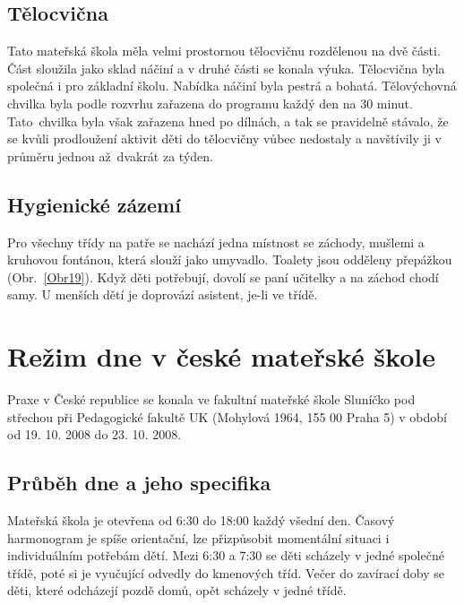 		\subsection{Tělocvična}
			Tato mateřská škola měla velmi prostornou tělocvičnu rozdělenou na dvě části. Část sloužila jako sklad náčiní a v druhé části se konala výuka. Tělocvična byla společná i pro základní školu. Nabídka náčiní byla pestrá a bohatá. Tělovýchovná chvilka byla podle rozvrhu zařazena do programu každý den na 30 minut. Tato chvilka byla však zařazena hned po dílnách, a tak se pravidelně stávalo, že se kvůli prodloužení aktivit děti do tělocvičny vůbec nedostaly a navštívily ji v průměru jednou až dvakrát za týden. 

		\subsection{Hygienické zázemí}
		\label{zachody}
			Pro všechny třídy na patře se nachází jedna místnost se záchody, mušlemi a kruhovou fontánou, která slouží jako umyvadlo. Toalety jsou odděleny přepážkou (Obr.~\ref{Obr19}). Když děti potřebují, dovolí se paní učitelky a na záchod chodí samy. U menších dětí je doprovází asistent, je-li ve třídě. 
	



\section{Režim dne v české mateřské škole}

		Praxe v České republice se konala ve fakultní mateřské škole Sluníčko pod střechou při Pedagogické fakultě UK (Mohylová 1964, 155 00 Praha 5) v období od 19. 10. 2008 do 23. 10. 2008. 

	\subsection{Průběh dne a jeho specifika}

			Mateřská škola je otevřena od 6:30 do 18:00 každý všední den. Časový harmonogram je spíše orientační, lze přizpůsobit momentální situaci i individuálním potřebám dětí. Mezi 6:30 a 7:30 se děti scházely v jedné společné třídě, poté si je vyučující odvedly do kmenových tříd. Večer do zavírací doby se děti, které odcházejí pozdě domů, opět scházely v jedné třídě.

